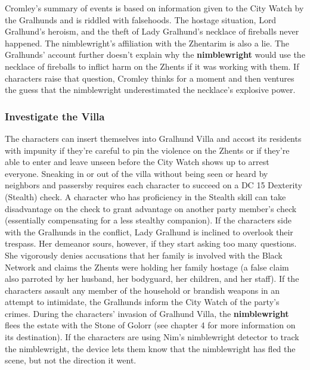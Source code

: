 \documentclass[10pt,a4paper,twoside,twocolumn,openany,nodeprecatedcode]{dndbook}
\begin{document}
Cromley's summary of events is based on information given to the City Watch by the Gralhunds and is riddled with falsehoods. The hostage situation, Lord Gralhund's heroism, and the theft of Lady Gralhund's necklace of fireballs never happened. The nimblewright's affiliation with the Zhentarim is also a lie. The Gralhunds' account further doesn't explain why the \textbf{nimblewright} would use the necklace of fireballs to inflict harm on the Zhents if it was working with them. If characters raise that question, Cromley thinks for a moment and then ventures the guess that the nimblewright underestimated the necklace's explosive power.
\subsubsection{Investigate the Villa}
The characters can insert themselves into Gralhund Villa and accost its residents with impunity if they're careful to pin the violence on the Zhents or if they're able to enter and leave unseen before the City Watch shows up to arrest everyone.
Sneaking in or out of the villa without being seen or heard by neighbors and passersby requires each character to succeed on a DC 15 Dexterity (Stealth) check. A character who has proficiency in the Stealth skill can take disadvantage on the check to grant advantage on another party member's check (essentially compensating for a less stealthy companion).
If the characters side with the Gralhunds in the conflict, Lady Gralhund is inclined to overlook their trespass. Her demeanor sours, however, if they start asking too many questions. She vigorously denies accusations that her family is involved with the Black Network and claims the Zhents were holding her family hostage (a false claim also parroted by her husband, her bodyguard, her children, and her staff). If the characters assault any member of the household or brandish weapons in an attempt to intimidate, the Gralhunds inform the City Watch of the party's crimes.
During the characters' invasion of Gralhund Villa, the \textbf{nimblewright} flees the estate with the Stone of Golorr (see chapter 4 for more information on its destination). If the characters are using Nim's nimblewright detector to track the nimblewright, the device lets them know that the nimblewright has fled the scene, but not the direction it went.
\end{document}
